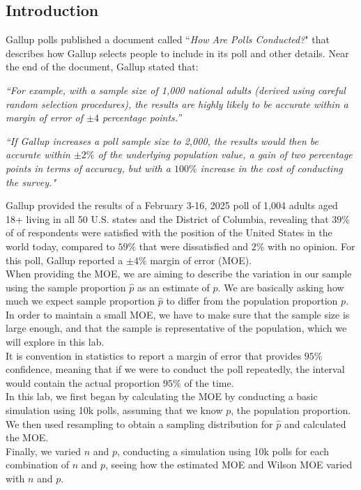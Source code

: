 \documentclass{article}\usepackage[]{graphicx}\usepackage[]{xcolor}
\begin{document}
\begin{multicols}{2}
\section{Introduction}
Gallup polls published a document called ``\textit{How Are Polls Conducted?}" that describes how Gallup selects people to include in its poll and other details. Near the end of the document, Gallup stated that: 
\begin{center}
\textit{``For example, with a sample size of 1,000 national adults (derived using careful random selection procedures), the results are highly likely to be accurate within a margin of error of $\pm 4$ percentage points.”}
\end{center}
\begin{center}
\textit{``If Gallup increases a poll sample size to 2,000, the results would then be accurate within $\pm 2\%$ of the underlying population value, a gain of two percentage points in terms of accuracy, but with a $100\%$ increase in the cost of conducting the survey."}
\end{center}
\indent Gallup provided the results of a February 3-16, 2025 poll of 1,004 adults aged 18+ living in all 50 U.S. states and the District of Columbia, revealing that $39\%$ of of respondents were satisfied with the position of the United States in the world today, compared to $59\%$ that were dissatisfied and $2\%$ with no opinion. For this poll, Gallup reported a $\pm 4\%$ margin of error (MOE). \\
\indent When providing the MOE, we are aiming to describe the variation in our sample using the sample proportion $\hat{p}$ as an estimate of $p$. We are basically asking how much we expect sample proportion $\hat{p}$ to differ from the population proportion $p$. In order to maintain a small MOE, we have to make sure that the sample size is large enough, and that the sample is representative of the population, which we will explore in this lab. \\
\indent It is convention in statistics to report a margin of error that provides $95\%$ confidence, meaning that if we were to conduct the poll repeatedly, the interval would contain the actual proportion $95\%$ of the time. \\ 
\indent In this lab, we first began by calculating the MOE by conducting a basic simulation using 10k polls, assuming that we know $p$, the population proportion. \\
\indent We then used resampling to obtain a sampling distribution for $\hat{p}$ and calculated the MOE. \\
\indent Finally, we varied $n$ and $p$, conducting a simulation using 10k polls for each combination of $n$ and $p$, seeing how the estimated MOE and Wilson MOE varied with $n$ and $p$. 


\end{multicols}
\end{document}
